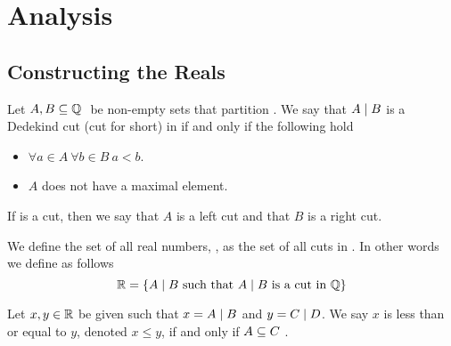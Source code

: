 

\chapter{Analysis}
    \section{Constructing the Reals}
        \begin{definition}
            Let $A, B \subseteq \mathbb{Q} \ $ be non-empty sets that
            partition . We say that $A \mid B$
            is a Dedekind cut (cut for short) in  if and only if the following hold
            \begin{itemize}
                \item
                    $\forall a \in A \ \forall b \in B \ a < b$.
                \item
                    $A$ does not have a maximal element.
            \end{itemize}
            If  is a cut, then we say that $A$ is a left cut and that $B$ is a right
            cut.
        \end{definition}
        \begin{definition}
            We define the set of all real numbers, , as the set of all cuts in .
            In other words we define  as follows
            \[
                \mathbb{R} = \left\{\mbox{$A \mid B$ such that $A \mid B$ is a cut in $\mathbb{Q}$}\right\}
            \]
        \end{definition}
        \begin{definition}
            Let $x, y \in \mathbb{R}$ be given such that $x = A \mid B$ and $y = C \mid D$.
            We say $x$ is less than or equal to $y$, denoted $x \le y$, if and only if $A \subseteq C \ $.
        \end{definition}
